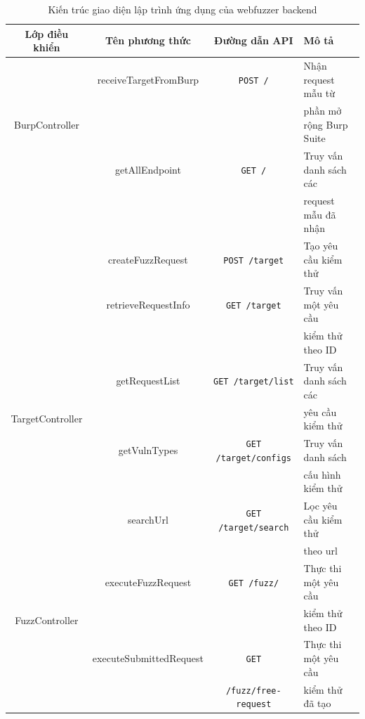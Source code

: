 \begin{table}[ht]
    \centering
    \caption{Kiến trúc giao diện lập trình ứng dụng của webfuzzer backend}
    \label{tab:api-design}
    \begin{tabular}[ht]{cccl}
        \toprule[1pt]\midrule[0.3pt]
            \textbf{Lớp điều khiển}&\textbf{Tên phương thức}&\textbf{Đường dẫn API}&\textbf{Mô tả}\\ 
        \midrule
            {}&receiveTargetFromBurp&\colorbox{gray!30}{\texttt{POST /}}&Nhận request mẫu từ\\
            BurpController&{}&{}& phần mở rộng Burp Suite\\
            \addlinespace
            {}&getAllEndpoint&\colorbox{gray!30}{\texttt{GET /}}&Truy vấn danh sách các \\
            {}&{}&{}&request mẫu đã nhận\\
            \midrule[0.3pt]
            {}&createFuzzRequest&\colorbox{gray!30}{\texttt{POST /target}}&Tạo yêu cầu kiểm thử\\
            \addlinespace
            {}&retrieveRequestInfo&\colorbox{gray!30}{\texttt{GET /target}}&Truy vấn một yêu cầu\\
            {}&{}&{}& kiểm thử theo ID\\
            \addlinespace
            {}&getRequestList&\colorbox{gray!30}{\texttt{GET /target/list}}&Truy vấn danh sách các\\
            TargetController&{}&{}&yêu cầu kiểm thử\\
            \addlinespace
            {}&getVulnTypes&\colorbox{gray!30}{\texttt{GET /target/configs}}&Truy vấn danh sách\\
            {}&{}&{}&cấu hình kiểm thử\\
            \addlinespace
            {}&searchUrl&\colorbox{gray!30}{\texttt{GET /target/search}}&Lọc yêu cầu kiểm thử\\
            {}&{}&{}&theo \acrshort{url}\\
            \midrule[0.3pt]
            {}&executeFuzzRequest&\colorbox{gray!30}{\texttt{GET /fuzz/}}&Thực thi một yêu cầu\\
            FuzzController&{}&{}&kiểm thử theo ID\\
            \addlinespace
            {}&executeSubmittedRequest&\colorbox{gray!30}{\texttt{GET}}&Thực thi một yêu cầu\\
            {}&{}&\colorbox{gray!30}{\texttt{/fuzz/free-request}}&kiểm thử đã tạo\\
        \midrule[0.3pt]\bottomrule[1pt]
    \end{tabular}
\end{table}
